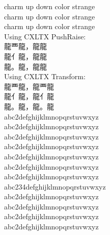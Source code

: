 \documentclass{article}
\newcommand{\cn}{\mktsFontfileSunexta\cjkgUseCjkGlue}
\begin{document}

%


charm up down color strange\\
charm {up} {down color} strange\\
charm up down color strange\\

Using CXLTX PushRaise:\\
{\cn 龍覀龍，龍龍}\\
{\cn 龍亻龍，龍龍}\\
{\cn 龍。龍，龍龍}\\

Using CXLTX Transform:\\
{\cn 龍覀龍，龍{覀}龍}\\
{\cn 龍亻龍，龍{亻}龍}\\
{\cn 龍。龍，龍{。}龍}\\


abc2defghijklmnopqrstuvwxyz\\
abc{2}defghijklmnopqrstuvwxyz\\
abc2defghijklmnopqrstuvwxyz\\

abc2defghijklmnopqrstuvwxyz\\
abc{2}defghijklmnopqrstuvwxyz\\
abc2defghijklmnopqrstuvwxyz\\

abc2defghijklmnopqrstuvwxyz\\
abc{234}defghijklmnopqrstuvwxyz\\
abc2defghijklmnopqrstuvwxyz\\

abc2defghijklmnopqrstuvwxyz\\
abc{2}defghijklmnopqrstuvwxyz\\
abc2defghijklmnopqrstuvwxyz\\


%
\end{document}
